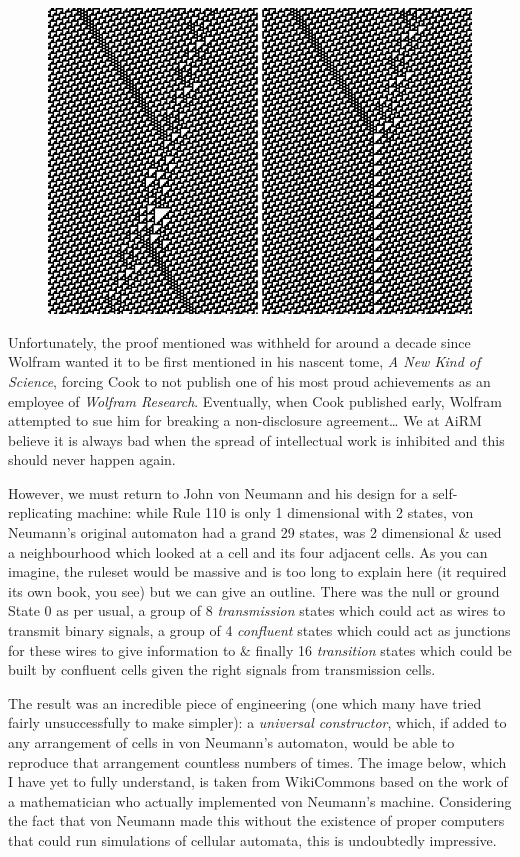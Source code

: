\begin{figure}[htbp]
\centering
\includegraphics{image_2.png}
\caption{}
\end{figure}

Unfortunately, the proof mentioned was withheld for around a decade
since Wolfram wanted it to be first mentioned in his nascent tome,
\emph{A New Kind of Science}, forcing Cook to not publish one of his
most proud achievements as an employee of \emph{Wolfram Research}.
Eventually, when Cook published early, Wolfram attempted to sue him for
breaking a non-disclosure agreement\ldots{} We at AiRM believe it is
always bad when the spread of intellectual work is inhibited and this
should never happen again.

However, we must return to John von Neumann and his design for a
self-replicating machine: while Rule 110 is only 1 dimensional with 2
states, von Neumann's original automaton had a grand 29 states, was 2
dimensional \& used a neighbourhood which looked at a cell and its four
adjacent cells. As you can imagine, the ruleset would be massive and is
too long to explain here (it required its own book, you see) but we can
give an outline. There was the null or ground State 0 as per usual, a
group of 8 \emph{transmission} states which could act as wires to
transmit binary signals, a group of 4 \emph{confluent} states which
could act as junctions for these wires to give information to \& finally
16 \emph{transition} states which could be built by confluent cells
given the right signals from transmission cells.

The result was an incredible piece of engineering (one which many have
tried fairly unsuccessfully to make simpler): a \emph{universal
constructor}, which, if added to any arrangement of cells in von
Neumann's automaton, would be able to reproduce that arrangement
countless numbers of times. The image below, which I have yet to fully
understand, is taken from WikiCommons based on the work of a
mathematician who actually implemented von Neumann's machine.
Considering the fact that von Neumann made this without the existence of
proper computers that could run simulations of cellular automata, this
is undoubtedly impressive.

